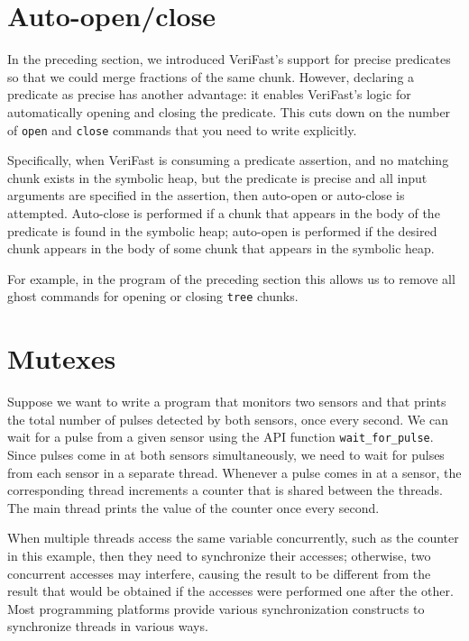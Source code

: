 \documentclass{article}
\begin{document}
\section{Auto-open/close}\label{section:auto-open-close}

In the preceding section, we introduced VeriFast's support for
precise predicates so that we could merge fractions of the same
chunk. However, declaring a predicate as precise has another
advantage: it enables VeriFast's logic for automatically
opening and closing the predicate. This cuts down on the number
of \lstinline|open| and \lstinline|close| commands that you
need to write explicitly.

Specifically, when VeriFast is consuming a predicate assertion,
and no matching chunk exists in the symbolic heap, but the
predicate is precise and all input arguments are specified in
the assertion, then auto-open or auto-close is attempted.
Auto-close is performed if a chunk that appears in the body of
the predicate is found in the symbolic heap; auto-open is
performed if the desired chunk appears in the body of some
chunk that appears in the symbolic heap.

For example, in the program of the preceding section this
allows us to remove all ghost commands for opening or closing
\lstinline|tree| chunks.

\section{Mutexes}\label{section:mutexes}

Suppose we want to write a program that monitors two sensors
and that prints the total number of pulses detected by both
sensors, once every second. We can wait for a pulse from a
given sensor using the API function \lstinline!wait_for_pulse!.
Since pulses come in at both sensors simultaneously, we need to
wait for pulses from each sensor in a separate thread. Whenever
a pulse comes in at a sensor, the corresponding thread
increments a counter that is shared between the threads. The
main thread prints the value of the counter once every second.

When multiple threads access the same variable concurrently,
such as the counter in this example, then they need to
synchronize their accesses; otherwise, two concurrent accesses
may interfere, causing the result to be different from the
result that would be obtained if the accesses were performed
one after the other. Most programming platforms provide various
synchronization constructs to synchronize threads in various
ways.
\end{document}
